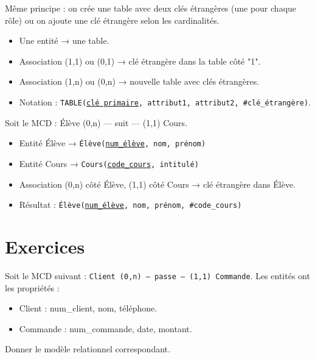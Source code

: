 \begin{definition}
Même principe : on crée une table avec deux clés étrangères (une pour chaque rôle) ou on ajoute une clé étrangère selon les cardinalités.
\end{definition}

\begin{aretenir}
\begin{itemize}
    \item Une entité → une table.
    \item Association (1,1) ou (0,1) → clé étrangère dans la table côté "1".
    \item Association (1,n) ou (0,n) → nouvelle table avec clés étrangères.
    \item Notation : \texttt{TABLE(\underline{clé primaire}, attribut1, attribut2, \#clé\_étrangère)}.
\end{itemize}
\end{aretenir}

\begin{exemple}
Soit le MCD : Élève (0,n) --- suit --- (1,1) Cours.
\begin{itemize}
    \item Entité Élève → \texttt{Élève(\underline{num\_élève}, nom, prénom)}
    \item Entité Cours → \texttt{Cours(\underline{code\_cours}, intitulé)}
    \item Association (0,n) côté Élève, (1,1) côté Cours → clé étrangère dans Élève.
    \item Résultat : \texttt{Élève(\underline{num\_élève}, nom, prénom, \#code\_cours)}
\end{itemize}
\end{exemple}

\section{Exercices}


\exo{}
Soit le MCD suivant : \texttt{Client (0,n) --- passe --- (1,1) Commande}. Les entités ont les propriétés :
\begin{itemize}
    \item Client : num\_client, nom, téléphone.
    \item Commande : num\_commande, date, montant.
\end{itemize}
Donner le modèle relationnel correspondant.

